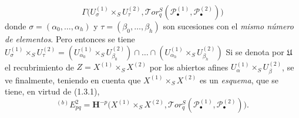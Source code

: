 \begin{env}[6.6.4]
\[  \Gamma\bigl(U_\sigma^{(1)}\times_S U_\tau^{(2)},
    \mathscr{T}\!or_q^S
    (\mathscr P_\bullet^{(1)},\mathscr P_\bullet^{(2)})\bigr)
\]
donde $\sigma=(\alpha_0,\ldots,\alpha_h)$ y
$\tau=(\beta_0,\ldots,\beta_h)$ son sucesiones con el \emph{mismo número de
elementos}. Pero entonces se tiene
$U_\sigma^{(1)}\times_S U_\tau^{(2)}
=(U_{\alpha_0}^{(1)}\times_S U_{\beta_0}^{(2)})\cap\ldots\cap
(U_{\alpha_h}^{(1)}\times_S U_{\beta_h}^{(2)})$
Si se denota por $\mathfrak U$ el recubrimiento de
$Z=X^{(1)}\times_S X^{(2)}$ por los abiertos afines
$U_\alpha^{(1)}\times_S U_\beta^{(2)}$, se ve finalmente, teniendo en cuenta
que $X^{(1)}\times_S X^{(2)}$ es un \emph{esquema}, que se tiene, en virtud de
(1.3.1),
\[
  {}^{(b)}E_{pq}^2
  =\mathbf H^{-p}\bigl(X^{(1)}\times_S X^{(2)},
    \mathscr{T}\!or_q^S
    (\mathscr P_\bullet^{(1)},\mathscr P_\bullet^{(2)})\bigr).
\]


\end{env}

